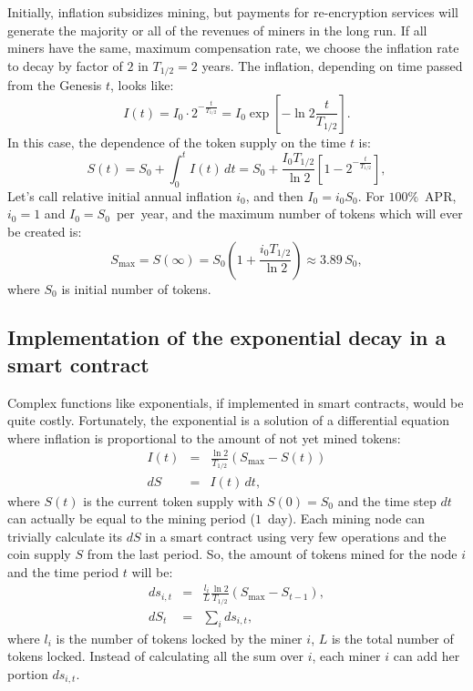 \documentclass[longbibliography,nofootinbib,twocolumn]{revtex4-1}
\begin{document}
Initially, inflation subsidizes mining, but payments for re-encryption services will generate the majority or all of the revenues of miners in the long run.
If all miners have the same, maximum compensation rate, we choose the inflation rate to decay by factor of $2$ in $T_{1/2} = 2$ years.
The inflation, depending on time passed from the Genesis $t$, looks like:
\begin{equation}
    I(t) = I_0 \cdot 2^{-\frac{t}{T_{1/2}}} = I_0 \exp\left[ -\ln{2} \frac{t}{T_{1/2}} \right].
\end{equation}
In this case, the dependence of the token supply on the time $t$ is:
\begin{equation}
    \label{eq:supply-time}
    S(t) = S_0 + \int_0^{t} I(t)\, dt = S_0 + \frac{I_0 T_{1/2}}{\ln{2}}\left[1 - 2^{-\frac{t}{T_{1/2}}} \right],
\end{equation}
Let's call relative initial annual inflation $i_0$, and then $I_0 = i_0 S_0$.
For $100\%$~APR, $i_0=1$ and $I_0=S_0$~per~year, and the maximum number of tokens which will ever be created is:
\begin{equation}
    S_{\max} = S(\infty) = S_0\left(1 + \frac{i_0 T_{1/2}}{\ln{2}}\right) \approx 3.89\, S_0,
\end{equation}
where $S_0$ is initial number of tokens.

\subsection{Implementation of the exponential decay in a smart contract}

Complex functions like exponentials, if implemented in smart contracts, would be quite costly.
Fortunately, the exponential is a solution of a differential equation where inflation is proportional to the amount of not yet mined tokens:
\begin{eqnarray}
    I(t) &=& \frac{\ln{2}}{T_{1/2}} \left( S_{\max} - S(t) \right)\\
    dS &=& I(t)\, dt,
\end{eqnarray}
where $S(t)$ is the current token supply with $S(0)=S_0$ and the time step $dt$ can actually be equal to the mining period ($1$~day).
Each mining node can trivially calculate its $dS$ in a smart contract using very few operations and the coin supply $S$ from the last period.
So, the amount of tokens mined for the node $i$ and the time period $t$ will be:
\begin{eqnarray}
    \label{eq:rate-max}
    ds_{i,t} &=& \frac{l_i}{L} \frac{\ln{2}}{T_{1/2}} \left( S_{\max} - S_{t-1} \right),\\
    dS_t &=& \sum_i ds_{i,t},
\end{eqnarray}
where $l_i$ is the number of tokens locked by the miner $i$, $L$ is the total number of tokens locked.
Instead of calculating all the sum over $i$, each miner $i$ can add her portion $ds_{i,t}$.
\end{document}
